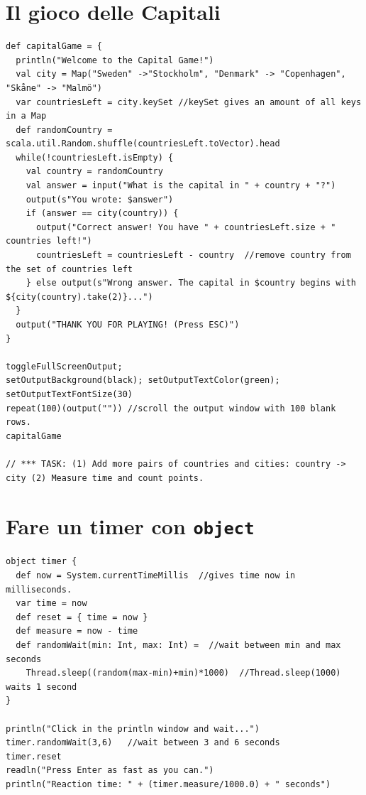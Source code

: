 \chapter{Il gioco delle Capitali}
\begin{lstlisting}[basicstyle={\ttfamily\fontsize{13}{16}\selectfont},numbers=none]
def capitalGame = {
  println("Welcome to the Capital Game!")
  val city = Map("Sweden" ->"Stockholm", "Denmark" -> "Copenhagen", "Skåne" -> "Malmö")
  var countriesLeft = city.keySet //keySet gives an amount of all keys in a Map 
  def randomCountry = scala.util.Random.shuffle(countriesLeft.toVector).head
  while(!countriesLeft.isEmpty) {
    val country = randomCountry
    val answer = input("What is the capital in " + country + "?")
    output(s"You wrote: $answer")
    if (answer == city(country)) {
      output("Correct answer! You have " + countriesLeft.size + " countries left!")
      countriesLeft = countriesLeft - country  //remove country from the set of countries left
    } else output(s"Wrong answer. The capital in $country begins with ${city(country).take(2)}...")
  }
  output("THANK YOU FOR PLAYING! (Press ESC)")
}

toggleFullScreenOutput;  
setOutputBackground(black); setOutputTextColor(green); setOutputTextFontSize(30)
repeat(100)(output("")) //scroll the output window with 100 blank rows.
capitalGame

// *** TASK: (1) Add more pairs of countries and cities: country -> city (2) Measure time and count points.
\end{lstlisting}
        
\chapter{Fare un timer con \lstinline{object}}
\begin{lstlisting}[basicstyle={\ttfamily\fontsize{14}{17}\selectfont},numbers=none]
object timer {
  def now = System.currentTimeMillis  //gives time now in milliseconds.
  var time = now
  def reset = { time = now }
  def measure = now - time
  def randomWait(min: Int, max: Int) =  //wait between min and max seconds
    Thread.sleep((random(max-min)+min)*1000)  //Thread.sleep(1000) waits 1 second
}

println("Click in the println window and wait...")
timer.randomWait(3,6)   //wait between 3 and 6 seconds
timer.reset
readln("Press Enter as fast as you can.")
println("Reaction time: " + (timer.measure/1000.0) + " seconds")
\end{lstlisting}
        
